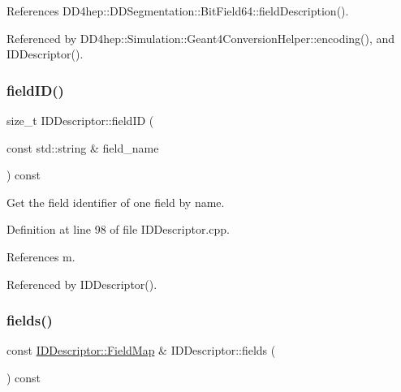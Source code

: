 References D\+D4hep\+::\+D\+D\+Segmentation\+::\+Bit\+Field64\+::field\+Description().



Referenced by D\+D4hep\+::\+Simulation\+::\+Geant4\+Conversion\+Helper\+::encoding(), and I\+D\+Descriptor().

\hypertarget{class_d_d4hep_1_1_geometry_1_1_i_d_descriptor_acc299eb8486e58723ef37522775cd696}{}\label{class_d_d4hep_1_1_geometry_1_1_i_d_descriptor_acc299eb8486e58723ef37522775cd696} 
\subsubsection{\texorpdfstring{field\+I\+D()}{fieldID()}}
{\footnotesize\ttfamily size\+\_\+t I\+D\+Descriptor\+::field\+ID (\begin{DoxyParamCaption}\item[{const std\+::string \&}]{field\+\_\+name }\end{DoxyParamCaption}) const}



Get the field identifier of one field by name. 



Definition at line 98 of file I\+D\+Descriptor.\+cpp.



References m.



Referenced by I\+D\+Descriptor().

\hypertarget{class_d_d4hep_1_1_geometry_1_1_i_d_descriptor_ad233517890d70599ba9f3c7f339cd26a}{}\label{class_d_d4hep_1_1_geometry_1_1_i_d_descriptor_ad233517890d70599ba9f3c7f339cd26a} 
\subsubsection{\texorpdfstring{fields()}{fields()}}
{\footnotesize\ttfamily const \hyperlink{class_d_d4hep_1_1_geometry_1_1_i_d_descriptor_ac9d6740c50e0c5cf495486c55e5640d4}{I\+D\+Descriptor\+::\+Field\+Map} \& I\+D\+Descriptor\+::fields (\begin{DoxyParamCaption}{ }\end{DoxyParamCaption}) const}



